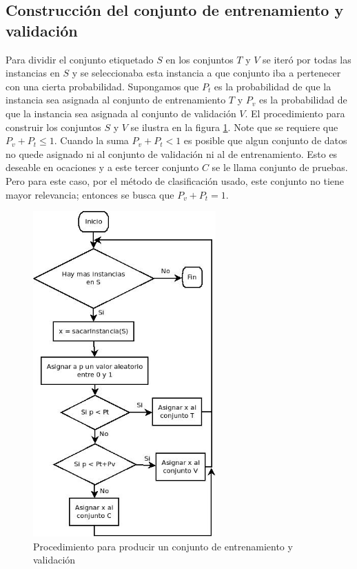 \documentclass[a4paper, 11pt, oneside]{report}
\begin{document}
\subsection{Construcción del conjunto de entrenamiento y validación}
\label{sect:trainingSet}

Para dividir el conjunto etiquetado $S$ en los conjuntos $T$ y $V$ se iteró por todas las instancias en $S$ y se seleccionaba esta instancia a que conjunto iba a pertenecer con una cierta probabilidad. Supongamos que $P_t$ es la probabilidad de que la instancia sea asignada al conjunto de entrenamiento $T$ y $P_v$ es la probabilidad de que la instancia sea asignada al conjunto de validación $V$. El procedimiento para construir los conjuntos $S$ y $V$ se ilustra en la figura \ref{fig:setPartition}. \newline \newline
Note que se requiere que $P_v + P_t \le 1$. Cuando la suma $P_v + P_t < 1$ es posible que algun conjunto de datos no quede asignado ni al conjunto de validación ni al de entrenamiento. Esto es deseable en ocaciones y a este tercer conjunto $C$ se le llama conjunto de pruebas. Pero para este caso, por el método de clasificación usado, este conjunto no tiene mayor relevancia; entonces se busca que $P_v + P_t = 1$.

\begin{figure}[htb]
\begin{center}
\leavevmode
\includegraphics[width=7cm]{diagrams/setPartition.jpg}
\end{center}
\caption{Procedimiento para producir un conjunto de entrenamiento y validación}
\label{fig:setPartition}
\end{figure}
\end{document}
